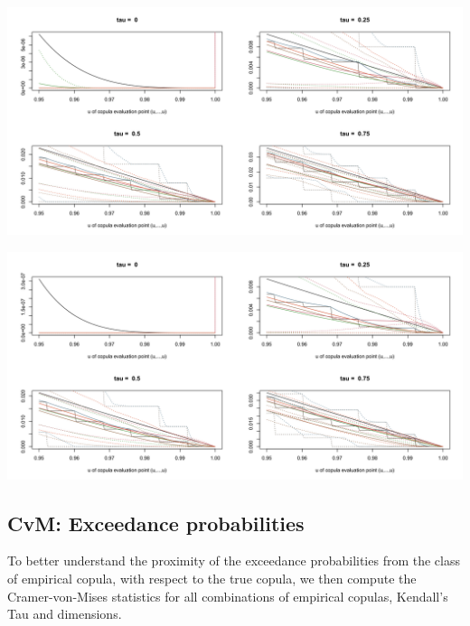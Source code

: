 \documentclass[12pt]{report}
\newcommand{\1}{\mathbf{1}}
\begin{document}
\begin{flushleft}
\begin{center}
\label{G_4d_s}
\includegraphics[width=17cm]{ExceedanceProb/G_4d_s.png}
\end{center}%

\begin{center}
\label{G_5d_s}
\includegraphics[width=17cm]{ExceedanceProb/G_5d_s.png}
\end{center}%

\newpage
\subsection{CvM: Exceedance probabilities}
To better understand the proximity of the exceedance probabilities from the class of empirical copula, with respect to the true copula, we then compute the Cramer-von-Mises statistics for all combinations of empirical copulas, Kendall's Tau and dimensions.


\end{flushleft}
\end{document}

